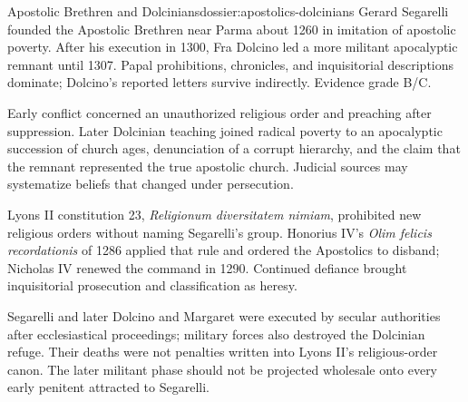 \begin{heresydossier}{Apostolic Brethren and Dolcinians}{dossier:apostolics-dolcinians}
\objectfield Gerard Segarelli founded the Apostolic Brethren near Parma about 1260 in imitation of apostolic poverty. After his execution in 1300, Fra Dolcino led a more militant apocalyptic remnant until 1307. Papal prohibitions, chronicles, and inquisitorial descriptions dominate; Dolcino's reported letters survive indirectly. Evidence grade B/C.

\propositionfield Early conflict concerned an unauthorized religious order and preaching after suppression. Later Dolcinian teaching joined radical poverty to an apocalyptic succession of church ages, denunciation of a corrupt hierarchy, and the claim that the remnant represented the true apostolic church. Judicial sources may systematize beliefs that changed under persecution.

\responsefield Lyons II constitution 23, \emph{Religionum diversitatem nimiam}, prohibited new religious orders without naming Segarelli's group. Honorius IV's \emph{Olim felicis recordationis} of 1286 applied that rule and ordered the Apostolics to disband; Nicholas IV renewed the command in 1290. Continued defiance brought inquisitorial prosecution and classification as heresy.

\aftermathfield Segarelli and later Dolcino and Margaret were executed by secular authorities after ecclesiastical proceedings; military forces also destroyed the Dolcinian refuge. Their deaths were not penalties written into Lyons II's religious-order canon. The later militant phase should not be projected wholesale onto every early penitent attracted to Segarelli.
\end{heresydossier}
